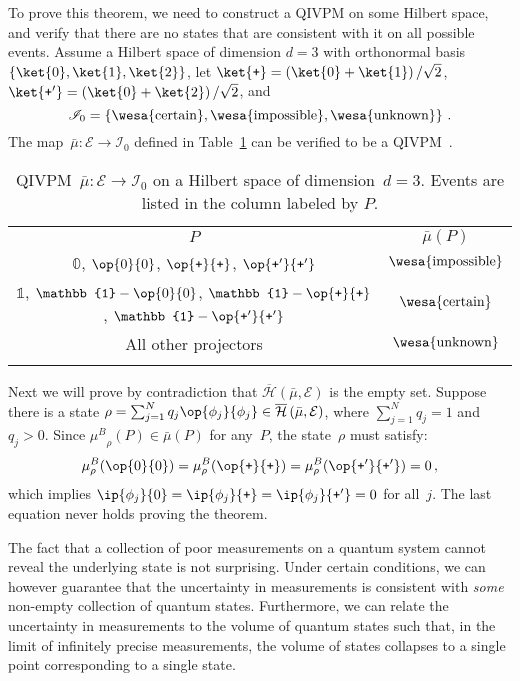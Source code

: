 \documentclass[english,reprint, aps, prl,superscriptaddress, showpacs,
showkeys, longbibliography, amsmath, amssymb, floatfix]{revtex4-1}
\theoremstyle{plain}
\theoremstyle{definition}
\newcommand{\Hilb}{\mathcal{H}}
\newcommand{\events}{\ensuremath{\mathcal{E}}}
\newcommand{\imposs}{{\text{\wesa{impossible}}}}
\newcommand{\necess}{{\text{\wesa{certain}}}}
\newcommand{\unknown}{{\text{\wesa{unknown}}}}
\newcommand{\proj}[1]{\op{#1}{#1}}
\newcommand{\ps}{\texttt{+}}
\newcommand{\coreBorn}{\ensuremath{\overline{\Hilb}}}
\newcommand{\muB}{\ensuremath{\mu^{B}}}
\begin{document}
To prove this theorem, we need to construct a QIVPM on some Hilbert
space, and verify that there are no states that are consistent with it
on all possible events. Assume a Hilbert space of dimension $d=3$ with
orthonormal basis $\left\{ \ket{0},\ket{1},\ket{2}\right\} $, let
$\ket{\ps}=\left(\ket{0}+\ket{1}\right)/\sqrt{2}$,
$\ket{\ps'}=\left(\ket{0}+\ket{2}\right)/\sqrt{2}$, and
\begin{equation}
\mathscr{I}_{0}=\left\{ \necess,\imposs,\unknown\right\} \,.\label{eq:3-value-intervals}
\end{equation}
The map~$\bar{\mu}:\events\rightarrow\mathscr{I}_{0}$ defined in
Table~\ref{tab:non-Born-QIVPM} can be verified to be a
QIVPM~\citep{TaiThesis2018}.
\begin{table}
\caption{\label{tab:non-Born-QIVPM}QIVPM~$\bar{\mu}:\events\rightarrow\mathscr{I}_{0}$
on a Hilbert space of dimension~$d=3$. Events are listed in the column
labeled by $P$.}

\begin{tabular}{cc}
\toprule 
\addlinespace
$P$ & $\bar{\mu}\left(P\right)$\tabularnewline\addlinespace
\midrule
\midrule 
\addlinespace
$\mathbb{0}$, $\proj{0}$, $\proj{\ps}$, $\proj{\ps'}$ & $\imposs$\tabularnewline\addlinespace
\midrule 
\addlinespace
$\mathbb{1}$, $\mathbb{1}-\proj{0}$, $\mathbb{1}-\proj{\ps}$, 
$\mathbb{1}-\proj{\ps'}$ & $\necess$\tabularnewline\addlinespace
\midrule 
\addlinespace
All other projectors & $\unknown$\tabularnewline\addlinespace
\bottomrule
\end{tabular}
\end{table}
Next we will prove by contradiction that
$\coreBorn\left(\bar{\mu},\events\right)$ is the empty set. Suppose
there is a state
$\rho=\sum_{j=1}^{N}q_{j}\proj{\phi_{j}}\in\coreBorn\left(\bar{\mu},\events\right)$,
where $\sum_{j=1}^{N}q_{j}=1$ and $q_{j} > 0$. Since
$\muB_{\rho}(P)\in\bar{\mu}(P)$ for any~$P$, the
state~$\rho$ must satisfy:
\begin{equation}
\muB_{\rho}(\proj{0})=\muB_{\rho}(\proj{\ps})=\muB_{\rho}(\proj{\ps'})=0\,,
\end{equation}
which implies $\ip{\phi_{j}}{0}=\ip{\phi_{j}}{\ps}=\ip{\phi_{j}}{\ps'}=0$
for all~$j$. The last equation never holds proving the theorem.

The fact that a collection of poor measurements on a quantum system
cannot reveal the underlying state is not surprising. Under certain
conditions, we can however guarantee that the uncertainty in
measurements is consistent with \emph{some} non-empty collection of
quantum states. Furthermore, we can relate the uncertainty in
measurements to the volume of quantum states such that, in the limit
of infinitely precise measurements, the volume of states collapses to
a single point corresponding to a single state.
\end{document}
